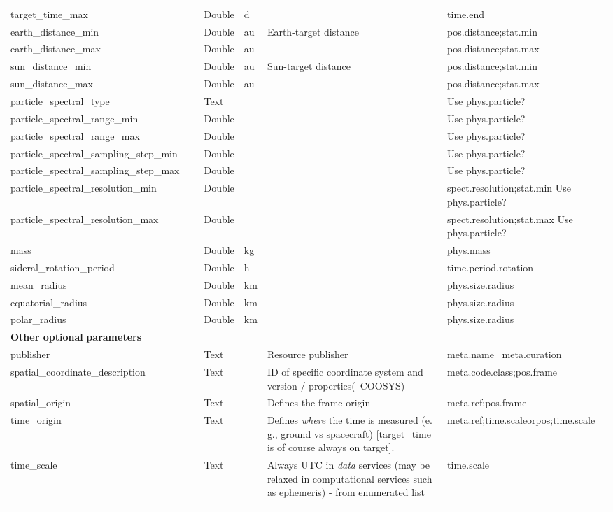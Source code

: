 \documentclass[11pt,a4paper]{ivoa}
\begin{document}
\begin{longtable}{p{3.5cm}p{0.5cm}p{1cm}p{1cm}p{7cm}p{3cm}}
target\_time\_max& &Double&d& &time.end\\
earth\_distance\_min& &Double&au&Earth-target distance&pos.distance;stat.min\\
earth\_distance\_max& &Double&au& &pos.distance;stat.max\\
sun\_distance\_min& &Double&au&Sun-target distance&pos.distance;stat.min\\
sun\_distance\_max& &Double&au& &pos.distance;stat.max\\
particle\_spectral\_type& &Text& & & Use phys.particle?\\
particle\_spectral\_range\_min& &Double& & & Use phys.particle?\\
particle\_spectral\_range\_max& &Double& & & Use phys.particle?\\
particle\_spectral\_sampling\_step\_min& &Double& & & Use phys.particle?\\
particle\_spectral\_sampling\_step\_max& &Double& & & Use phys.particle?\\
particle\_spectral\_resolution\_min& &Double& & &spect.resolution;stat.min Use phys.particle?\\
particle\_spectral\_resolution\_max& &Double& & &spect.resolution;stat.max Use phys.particle?\\
mass& &Double&kg& &phys.mass\\
sideral\_rotation\_period& &Double&h& &time.period.rotation\\
mean\_radius& &Double&km& &phys.size.radius\\
equatorial\_radius& &Double&km& &phys.size.radius\\
polar\_radius& &Double&km& &phys.size.radius\\
\textbf{Other optional}\textbf{ parameters}\textbf{}& & & & & \\
publisher& &Text& &Resource publisher&meta.name  meta.curation\\
spatial\_coordinate\_description& &Text& &ID of specific coordinate system and version / properties(~COOSYS)&meta.code.class;pos.frame\\
spatial\_origin& &Text& &Defines the frame origin&meta.ref;pos.frame\\
time\_origin& &Text& &Defines \emph{where} the time is measured (e. g., ground vs spacecraft) [target\_time is of course always on target].&meta.ref;time.scaleorpos;time.scale \\
time\_scale& &Text& &Always UTC in \emph{data} services (may be relaxed in computational services such as ephemeris) - from enumerated list&time.scale\\
\sptablerule
\end{longtable}
\endgroup
\end{document}

